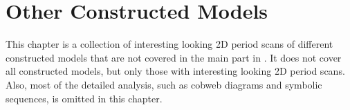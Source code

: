 \chapter{Other Constructed Models}
\label{chap:app.models}

This chapter is a collection of interesting looking 2D period scans of different constructed models that are not covered in the main part in .
It does not cover all constructed models, but only those with interesting looking 2D period scans.
Also, most of the detailed analysis, such as cobweb diagrams and symbolic sequences, is omitted in this chapter.


\clearpage

